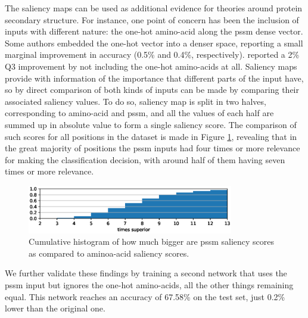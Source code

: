 \documentclass{article}
\begin{document}
The saliency maps can be used as additional evidence for theories around protein secondary structure. For instance, one point of concern has been the inclusion of inputs with different nature: the one-hot amino-acid along the pssm dense vector. Some authors \cite{Li2016,Zhou2018} embedded the one-hot vector into a denser space, reporting a small marginal improvement in accuracy (0.5\% and 0.4\%, respectively). \cite{Spencer2015} reported a 2\% Q3 improvement by not including the one-hot amino-acids at all. Saliency maps provide with information of the importance that different parts of the input have, so by direct comparison of both kinds of inputs can be made by comparing their associated saliency values. To do so, saliency map is split in two halves, corresponding to amino-acid and pssm, and all the values of each half are summed up in absolute value to form a single saliency score. The comparison of such scores for all positions in the dataset is made in Figure \ref{fig:aa_pssm}, revealing that in the great majority of positions the pssm inputs had four times or more relevance for making the classification decision, with around half of them having seven times or more relevance.
\begin{figure}
	\centering
	\centerline{\includegraphics[width=9cm]{aa_pssm}}
	\caption{Cumulative histogram of how much bigger are pssm saliency scores as compared to aminoa-acid saliency scores.}
	\label{fig:aa_pssm}
\end{figure}
We further validate these findings by training a second network that uses the pssm input but ignores the one-hot amino-acids, all the other things remaining equal. This network reaches an accuracy of 67.58\% on the test set, just 0.2\% lower than the original one.
\end{document}

